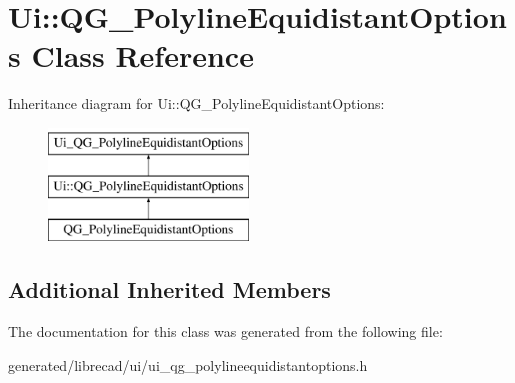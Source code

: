\hypertarget{classUi_1_1QG__PolylineEquidistantOptions}{\section{Ui\-:\-:Q\-G\-\_\-\-Polyline\-Equidistant\-Options Class Reference}
\label{classUi_1_1QG__PolylineEquidistantOptions}
}
Inheritance diagram for Ui\-:\-:Q\-G\-\_\-\-Polyline\-Equidistant\-Options\-:\begin{figure}[H]
\begin{center}
\leavevmode
\includegraphics[height=3.000000cm]{classUi_1_1QG__PolylineEquidistantOptions}
\end{center}
\end{figure}
\subsection*{Additional Inherited Members}


The documentation for this class was generated from the following file\-:\begin{DoxyCompactItemize}
\item 
generated/librecad/ui/ui\-\_\-qg\-\_\-polylineequidistantoptions.\-h\end{DoxyCompactItemize}
